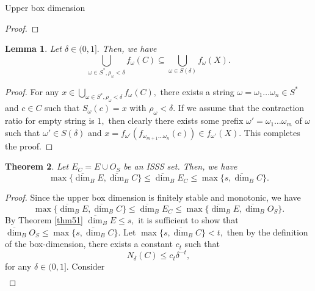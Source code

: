 \documentclass[12pt,oneside,reqno]{amsart}
\newtheorem{theorem}{Theorem}[section]
\newtheorem{lemma}[theorem]{Lemma}
\theoremstyle{definition}
\theoremstyle{remark}
\begin{document}
\begin{subsection}{Upper box dimension}
\begin{proof}
 \end{proof}
 \begin{lemma}\label{lemma54}
    Let $\delta \in (0,1].$ Then, we have 
    $$\bigcup_{\omega \in S^*, \rho_\omega < \delta } f_\omega (C) \subseteq \bigcup_{\omega \in S(\delta)} f_\omega(X).$$
 \end{lemma}
 \begin{proof}
    For any $x \in \bigcup_{\omega \in S^*, \rho_\omega < \delta } f_\omega (C),$ there exists a string $\omega = \omega_1\ldots \omega_n \in S^*$ and $c \in C$ such that $S_\omega(c)= x$ with $\rho_\omega < \delta.$ If we assume that the contraction ratio for empty string is $1,$ then clearly there exists some prefix $\omega'= \omega_1\ldots \omega_m$ of $\omega$ such that $\omega' \in S(\delta)$ and $x = f_{\omega'}(f_{\omega_{m+1}\ldots \omega_n} (c)) \in f_{\omega'} (X).$ This completes the proof.
 \end{proof}
\begin{theorem}
    Let $E_C= E \cup O_S$ be an ISSS set. Then, we have 
    $$\max \{\overline{\dim}_B E,\overline{\dim}_B C\} \le \overline{\dim}_B E_C \le \max \{s,\overline{\dim}_B C \}.$$
\end{theorem}
\begin{proof}
    Since the upper box dimension is finitely stable and  monotonic, we have
    $$\max \{\overline{\dim}_B E,\overline{\dim}_B C\} \le \overline{\dim}_B E_C \le \max \{\overline{\dim}_B E,\overline{\dim}_B O_S\}.$$
    By Theorem \ref{thm51} $\overline{\dim}_B E \le s,$ it is sufficient to show that $\overline{\dim}_B O_S \le \max\{s, \overline{\dim}_B C\}.$
    Let $\max\{s,\overline{\dim}_B C\} < t,$ then by the definition of the box-dimension, there exists a constant $c_t$ such that $$N_\delta(C) \le c_t \delta^{-t},$$ for any $\delta \in (0,1].$ Consider
    \begin{equation*}
        \begin{aligned}

\end{aligned}
\end{equation*}
\end{proof}
\end{subsection}
\end{document}
